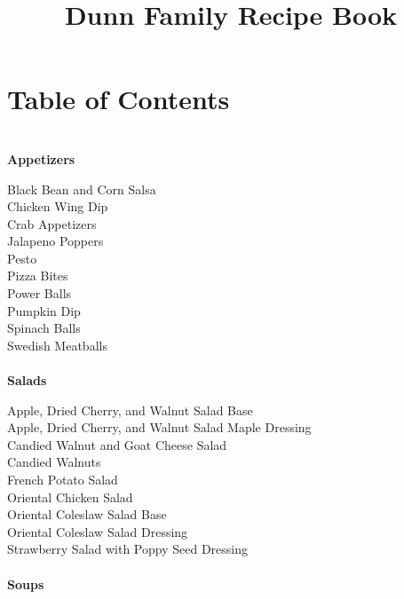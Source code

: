 \documentclass[11pt, twoside, openany]{book}
\title{ \LARGE \textbf{Dunn Family Recipe Book}}
\begin{document}
\maketitle
\section*{Table of Contents}
{~\vspace{2mm}\\ \Large \textbf{Appetizers}}\hfill\textbf{\pageref{appetizers}}

Black Bean and Corn Salsa\hrulefill\pageref{black-bean-and-corn-salsa}\\
Chicken Wing Dip\hrulefill\pageref{chicken-wing-dip}\\
Crab Appetizers\hrulefill\pageref{crab-appetizers}\\
Jalapeno Poppers\hrulefill\pageref{jalapeno-poppers}\\
Pesto\hrulefill\pageref{pesto}\\
Pizza Bites\hrulefill\pageref{pizza-bites}\\
Power Balls\hrulefill\pageref{power-balls}\\
Pumpkin Dip\hrulefill\pageref{pumpkin-dip}\\
Spinach Balls\hrulefill\pageref{spinach-balls}\\
Swedish Meatballs\hrulefill\pageref{swedish-meatballs}\\
{~\vspace{2mm}\\ \Large \textbf{Salads}}\hfill\textbf{\pageref{salads}}

Apple, Dried Cherry, and Walnut Salad Base\hrulefill\pageref{apple,-dried-cherry,-and-walnut-salad-base}\\
Apple, Dried Cherry, and Walnut Salad Maple Dressing\hrulefill\pageref{apple,-dried-cherry,-and-walnut-salad-maple-dressing}\\
Candied Walnut and Goat Cheese Salad\hrulefill\pageref{candied-walnut-and-goat-cheese-salad}\\
Candied Walnuts\hrulefill\pageref{candied-walnuts}\\
French Potato Salad\hrulefill\pageref{french-potato-salad}\\
Oriental Chicken Salad\hrulefill\pageref{oriental-chicken-salad}\\
Oriental Coleslaw Salad Base\hrulefill\pageref{oriental-coleslaw-salad-base}\\
Oriental Coleslaw Salad Dressing\hrulefill\pageref{oriental-coleslaw-salad-dressing}\\
Strawberry Salad with Poppy Seed Dressing\hrulefill\pageref{strawberry-salad-with-poppy-seed-dressing}\\
{~\vspace{2mm}\\ \Large \textbf{Soups}}\hfill\textbf{\pageref{soups}}
\end{document}

